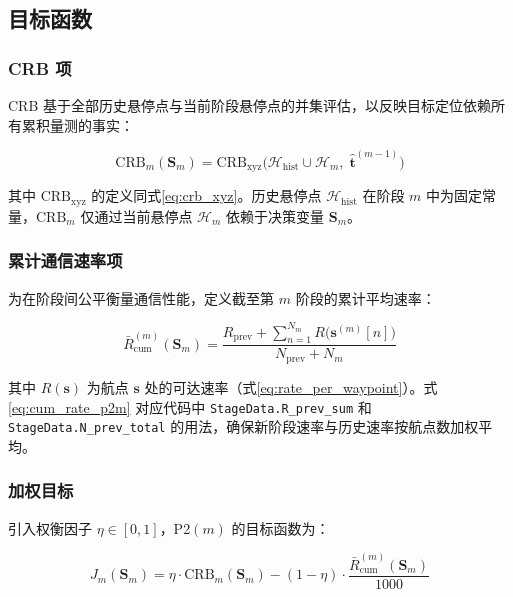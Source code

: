 \subsection{目标函数}

\subsubsection{CRB 项}

CRB 基于全部历史悬停点与当前阶段悬停点的并集评估，以反映目标定位依赖所有累积量测的事实：

\begin{equation}
\mathrm{CRB}_m(\mathbf{S}_m)=\mathrm{CRB}_{\mathrm{xyz}}\bigl(\mathcal{H}_{\mathrm{hist}}\cup\mathcal{H}_m,\;\hat{\mathbf{t}}^{(m-1)}\bigr)
\label{eq:crb_p2m}
\end{equation}

其中 $\mathrm{CRB}_{\mathrm{xyz}}$ 的定义同式\eqref{eq:crb_xyz}。历史悬停点 $\mathcal{H}_{\mathrm{hist}}$ 在阶段 $m$ 中为固定常量，$\mathrm{CRB}_m$ 仅通过当前悬停点 $\mathcal{H}_m$ 依赖于决策变量 $\mathbf{S}_m$。

\subsubsection{累计通信速率项}

为在阶段间公平衡量通信性能，定义截至第 $m$ 阶段的累计平均速率\cite{Jing2022}：

\begin{equation}
\bar{R}_{\mathrm{cum}}^{(m)}(\mathbf{S}_m)=
\frac{\displaystyle R_{\mathrm{prev}}+\sum_{n=1}^{N_m}R\bigl(\mathbf{s}^{(m)}[n]\bigr)}
{\displaystyle N_{\mathrm{prev}}+N_m}
\label{eq:cum_rate_p2m}
\end{equation}

其中 $R(\mathbf{s})$ 为航点 $\mathbf{s}$ 处的可达速率（式\eqref{eq:rate_per_waypoint}）。式\eqref{eq:cum_rate_p2m} 对应代码中 \texttt{StageData.R\_prev\_sum} 和 \texttt{StageData.N\_prev\_total} 的用法，确保新阶段速率与历史速率按航点数加权平均。

\subsubsection{加权目标}

引入权衡因子 $\eta\in[0,1]$，P2$(m)$ 的目标函数为：

\begin{equation}
J_m(\mathbf{S}_m)=\eta\cdot\mathrm{CRB}_m(\mathbf{S}_m)-(1-\eta)\cdot\frac{\bar{R}_{\mathrm{cum}}^{(m)}(\mathbf{S}_m)}{1000}
\label{eq:obj_p2m}
\end{equation}

